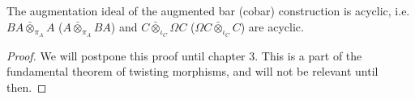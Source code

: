 \documentclass[../thesis.tex]{subfiles}
\begin{document}
            \begin{proposition}\label{prop: aug-bar-ac}
                The augmentation ideal of the augmented bar (cobar) construction is acyclic, i.e. $BA \bar{\otimes}_{\pi_A} A$ ($A \bar{\otimes}_{\pi_A} BA$) and $C \bar{\otimes}_{\iota_C}\Omega C$ ($\Omega C \bar{\otimes}_{\iota_C} C$) are acyclic.
            \end{proposition}

            \begin{proof}
                We will postpone this proof until chapter 3. This is a part of the fundamental theorem of twisting morphisms, and will not be relevant until then.
            \end{proof}


        



\end{document}
